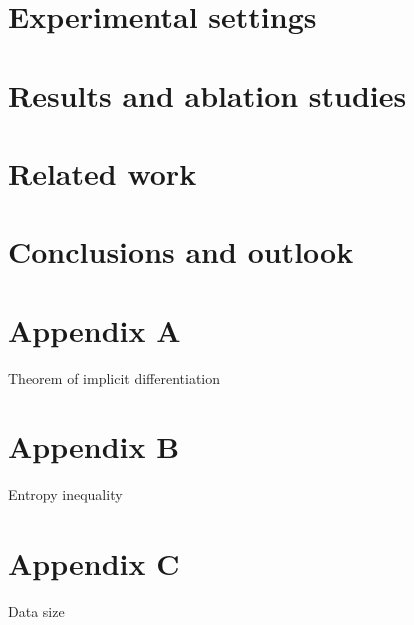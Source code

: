 \documentclass[11pt]{article}
\begin{document}
%
%
%
%
%
\section{Experimental settings}
\section{Results and ablation studies}
\section{Related work}
\section{Conclusions and outlook}



\appendix
\section{Appendix A}
\label{appendix:a}
Theorem of implicit differentiation

\section{Appendix B}
\label{appendix:b}
Entropy inequality
\section{Appendix C}
\label{appendix:c}
Data size


\end{document}
